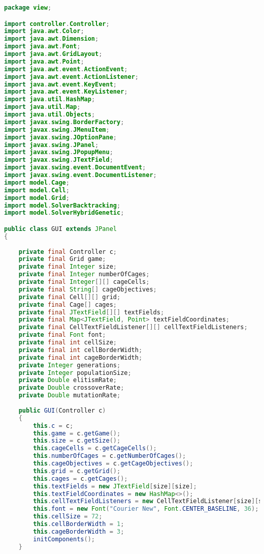 \begin{lstlisting}[language=Java,basicstyle=\tiny,caption=GUI.java]
package view;

import controller.Controller;
import java.awt.Color;
import java.awt.Dimension;
import java.awt.Font;
import java.awt.GridLayout;
import java.awt.Point;
import java.awt.event.ActionEvent;
import java.awt.event.ActionListener;
import java.awt.event.KeyEvent;
import java.awt.event.KeyListener;
import java.util.HashMap;
import java.util.Map;
import java.util.Objects;
import javax.swing.BorderFactory;
import javax.swing.JMenuItem;
import javax.swing.JOptionPane;
import javax.swing.JPanel;
import javax.swing.JPopupMenu;
import javax.swing.JTextField;
import javax.swing.event.DocumentEvent;
import javax.swing.event.DocumentListener;
import model.Cage;
import model.Cell;
import model.Grid;
import model.SolverBacktracking;
import model.SolverHybridGenetic;

public class GUI extends JPanel
{
    
    private final Controller c;
    private final Grid game;
    private final Integer size;
    private final Integer numberOfCages;
    private final Integer[][] cageCells;
    private final String[] cageObjectives;
    private final Cell[][] grid;
    private final Cage[] cages;
    private final JTextField[][] textFields;
    private final Map<JTextField, Point> textFieldCoordinates;
    private final CellTextFieldListener[][] cellTextFieldListeners;
    private final Font font;
    private final int cellSize;
    private final int cellBorderWidth;
    private final int cageBorderWidth;
    private Integer generations;
    private Integer populationSize;
    private Double elitismRate;
    private Double crossoverRate;
    private Double mutationRate;
    
    public GUI(Controller c)
    {
        this.c = c;
        this.game = c.getGame();
        this.size = c.getSize();
        this.cageCells = c.getCageCells();
        this.numberOfCages = c.getNumberOfCages();
        this.cageObjectives = c.getCageObjectives();
        this.grid = c.getGrid();
        this.cages = c.getCages();
        this.textFields = new JTextField[size][size];
        this.textFieldCoordinates = new HashMap<>();
        this.cellTextFieldListeners = new CellTextFieldListener[size][size];
        this.font = new Font("Courier New", Font.CENTER_BASELINE, 36);
        this.cellSize = 72;
        this.cellBorderWidth = 1;
        this.cageBorderWidth = 3;
        initComponents();
    }
    

\end{lstlisting}
